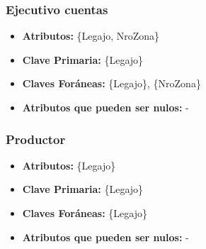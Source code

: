 \documentclass[a4paper,11pt]{article}
\begin{document}


	
	
	
	

\subsubsection{Ejecutivo cuentas}

\begin{itemize}

	\item \textbf{Atributos:} \{Legajo, NroZona\}
	
	\item \textbf{Clave Primaria:} \{Legajo\}
	
	\item \textbf{Claves Foráneas:} \{Legajo\}, \{NroZona\}
	
	\item \textbf{Atributos que pueden ser nulos:} -
	
\end{itemize}

\subsubsection{Productor}

\begin{itemize}

	\item \textbf{Atributos:} \{Legajo\}
	
	\item \textbf{Clave Primaria:} \{Legajo\}
	
	\item \textbf{Claves Foráneas:} \{Legajo\}
	
	\item \textbf{Atributos que pueden ser nulos:} -
	
\end{itemize}
\end{document}

